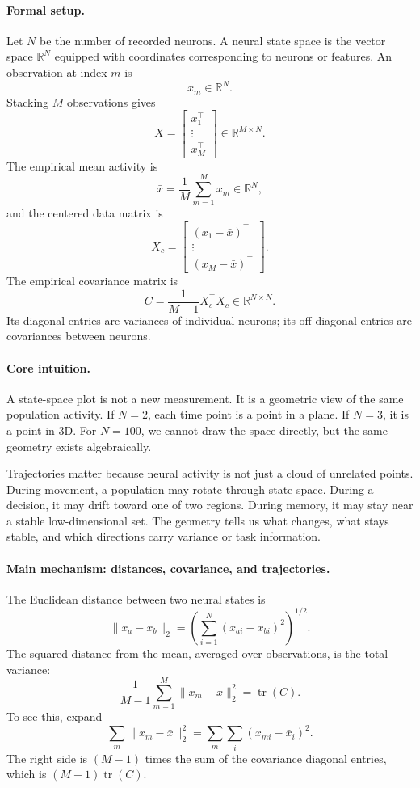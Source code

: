 \paragraph{Formal setup.}
Let \(N\) be the number of recorded neurons. A neural state space is the vector space \(\mathbb R^N\) equipped with coordinates corresponding to neurons or features. An observation at index \(m\) is
\[
x_m\in\mathbb R^N.
\]
Stacking \(M\) observations gives
\[
X=
\begin{bmatrix}
x_1^\top\\
\vdots\\
x_M^\top
\end{bmatrix}
\in\mathbb R^{M\times N}.
\]
The empirical mean activity is
\[
\bar x=\frac1M\sum_{m=1}^M x_m\in\mathbb R^N,
\]
and the centered data matrix is
\[
X_c=
\begin{bmatrix}
(x_1-\bar x)^\top\\
\vdots\\
(x_M-\bar x)^\top
\end{bmatrix}.
\]
The empirical covariance matrix is
\[
\boxed{
C=\frac{1}{M-1}X_c^\top X_c\in\mathbb R^{N\times N}.
}
\]
Its diagonal entries are variances of individual neurons; its off-diagonal entries are covariances between neurons.

\paragraph{Core intuition.}
A state-space plot is not a new measurement. It is a geometric view of the same population activity. If \(N=2\), each time point is a point in a plane. If \(N=3\), it is a point in 3D. For \(N=100\), we cannot draw the space directly, but the same geometry exists algebraically.

Trajectories matter because neural activity is not just a cloud of unrelated points. During movement, a population may rotate through state space. During a decision, it may drift toward one of two regions. During memory, it may stay near a stable low-dimensional set. The geometry tells us what changes, what stays stable, and which directions carry variance or task information.

\paragraph{Main mechanism: distances, covariance, and trajectories.}
The Euclidean distance between two neural states is
\[
\|x_a-x_b\|_2
=\left(\sum_{i=1}^N (x_{ai}-x_{bi})^2\right)^{1/2}.
\]
The squared distance from the mean, averaged over observations, is the total variance:
\[
\frac{1}{M-1}\sum_{m=1}^M \|x_m-\bar x\|_2^2
=\operatorname{tr}(C).
\]
To see this, expand
\[
\sum_m \|x_m-\bar x\|_2^2
=\sum_m\sum_i (x_{mi}-\bar x_i)^2.
\]
The right side is \((M-1)\) times the sum of the covariance diagonal entries, which is \((M-1)\operatorname{tr}(C)\).


